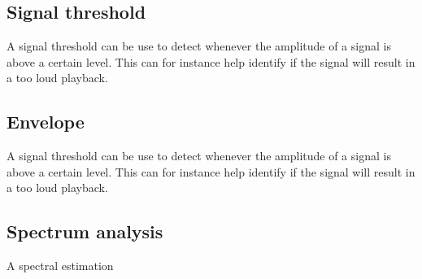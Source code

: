 \subsection*{Signal threshold}
A signal threshold can be use to detect whenever the amplitude of a signal is above a certain level. This can for instance help identify if the signal will result in a too loud playback.

\subsection*{Envelope}
A signal threshold can be use to detect whenever the amplitude of a signal is above a certain level. This can for instance help identify if the signal will result in a too loud playback. 

\subsection*{Spectrum analysis}
A spectral estimation 



























